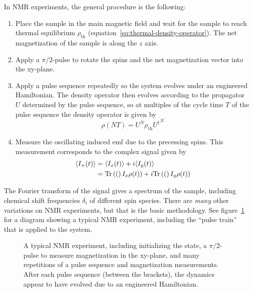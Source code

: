 In NMR experiments, the general procedure is the following:
\begin{enumerate}
    \item Place the sample in the main magnetic field and wait for the sample to reach thermal equilibrium $\rho_\text{th}$ (equation~\ref{eq:thermal-density-operator}). The net magnetization of the sample is along the $z$ axis.
    \item Apply a $\pi/2$-pulse to rotate the spins and the net magnetization vector into the xy-plane.
    \item Apply a pulse sequence repeatedly so the system evolves under an engineered Hamiltonian. The density operator then evolves according to the propagator $U$ determined by the pulse sequence, so at multiples of the cycle time $T$ of the pulse sequence the density operator is given by
    \begin{equation}
        \rho(NT) = U^N \rho_\text{th} {U^\dagger}^N
    \end{equation}
    \item Measure the oscillating induced emf due to the precessing spins. This measurement corresponds to the complex signal given by
    \begin{equation}
    \begin{aligned}
        \langle I_+(t) \rangle &= \langle I_x(t) \rangle + i \langle I_y(t) \rangle \\
            &= \text{Tr}\left( ( \right)I_x \rho(t)) + i\text{Tr}\left( ( \right)I_y \rho(t))
    \end{aligned}
    \end{equation}
\end{enumerate}
The Fourier transform of the signal gives a spectrum of the sample, including chemical shift frequencies $\delta_i$ of different spin species. There are \emph{many} other variations on NMR experiments, but that is the basic methodology. See figure~\ref{fig:NMR-Pulse-Train} for a diagram showing a typical NMR experiment, including the ``pulse train'' that is applied to the system.

\begin{figure}[H]
    \centering
    
    \caption{A typical NMR experiment, including initializing the state, a $\pi/2$-pulse to measure magnetization in the xy-plane, and many repetitions of a pulse sequence and magnetization measurements. After each pulse sequence (between the brackets), the dynamics appear to have evolved due to an engineered Hamiltonian.}
    \label{fig:NMR-Pulse-Train}
\end{figure}

